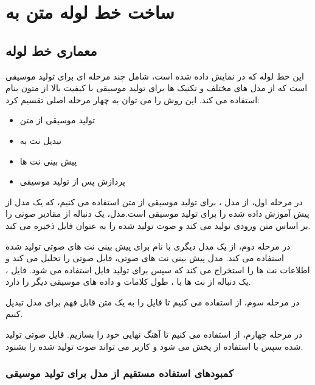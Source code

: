 
\chapter{ساخت خط لوله متن به }
\section{معماری خط‌ لوله}

این خط لوله  که در  نمایش داده شده است، شامل چند مرحله ای برای تولید موسیقی است که از مدل های مختلف و تکنیک ها برای تولید موسیقی با کیفیت بالا از متون بنام استفاده می کند. این روش را می توان به چهار مرحله اصلی تقسیم کرد:
\begin{itemize}
      \item  تولید موسیقی از متن
      \item  تبدیل نت به 
      \item پیش بینی نت ها
      \item پردازش پس از تولید موسیقی
\end{itemize}

در مرحله اول، از مدل   \cite{copet2023simple} ، برای تولید موسیقی از متن استفاده می کنیم، که یک مدل از پیش آموزش‌ داده شده را برای تولید موسیقی است.مدل، یک دنباله از مقادیر صوتی را بر اساس متن ورودی تولید می کند و صوت تولید شده را به عنوان فایل  ذخیره می کند.

در مرحله دوم، از یک مدل دیگری با نام  \cite{2022_BittnerBRME_LightweightNoteTranscription_ICASSP} برای پیش بینی نت های صوتی تولید شده استفاده می کند. مدل پیش بینی نت های صوتی، فایل صوتی را تحلیل می کند و اطلاعات نت ها را استخراج می کند که سپس برای تولید فایل  استفاده می شود. فایل ، یک دنباله از نت ها با ، طول کلامات و داده های موسیقی دیگر را دارد.



در مرحله سوم، از   استفاده می کنیم تا فایل  را به یک متن قابل فهم برای مدل تبدیل کنیم.

در مرحله چهارم، از  استفاده می کنیم تا آهنگ نهایی خود را بسازیم.
فایل صوتی تولید شده سپس با استفاده از  پخش می شود و کاربر می تواند صوت تولید شده را بشنود.

\subsection{کمبودهای استفاده مستقیم از مدل  برای تولید موسیقی}

